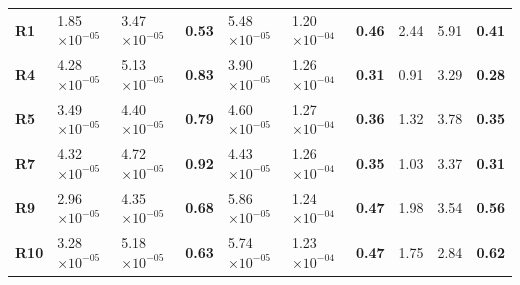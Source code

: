 \documentclass[encoding=utf8,british]{tumphthesis}
\begin{document}
\begin{table}[H]
\begin{subtable}{1\textwidth}
{\begin{tabular}{|l|llr|llr|llr|}
\rowcolor[HTML]{CFE2F3} 
\textbf{R1}  & 1.85$\times 10^{-05}$ & 3.47$\times 10^{-05}$ & \textbf{0.53} & 5.48$\times 10^{-05}$  & 1.20$\times 10^{-04}$ & \textbf{0.46}                                & 2.44 & 5.91  & \textbf{0.41} \\
\textbf{R4}  & 4.28$\times 10^{-05}$ & 5.13$\times 10^{-05}$ & \textbf{0.83} & 3.90$\times 10^{-05}$  & 1.26$\times 10^{-04}$ & \textbf{0.31}                                & 0.91 & 3.29  & \textbf{0.28} \\
\rowcolor[HTML]{CFE2F3} 
\textbf{R5}  & 3.49$\times 10^{-05}$ & 4.40$\times 10^{-05}$ & \textbf{0.79} & 4.60$\times 10^{-05}$  & 1.27$\times 10^{-04}$ & \textbf{0.36}                                & 1.32 & 3.78  & \textbf{0.35} \\
\textbf{R7}  & 4.32$\times 10^{-05}$ & 4.72$\times 10^{-05}$ & \textbf{0.92} & 4.43$\times 10^{-05}$  & 1.26$\times 10^{-04}$ & \textbf{0.35}                                & 1.03 & 3.37  & \textbf{0.31} \\
\rowcolor[HTML]{CFE2F3} 
\textbf{R9}  & 2.96$\times 10^{-05}$ & 4.35$\times 10^{-05}$ & \textbf{0.68} & 5.86$\times 10^{-05}$  & 1.24$\times 10^{-04}$ & \textbf{0.47}                                & 1.98 & 3.54  & \textbf{0.56} \\
\textbf{R10} & 3.28$\times 10^{-05}$ & 5.18$\times 10^{-05}$ & \textbf{0.63} & 5.74$\times 10^{-05}$ & 1.23$\times 10^{-04}$ & \textbf{0.47}                                & 1.75 & 2.84  & \textbf{0.62} \\

\end{tabular}}
\end{subtable}
\end{table}
\end{document}
